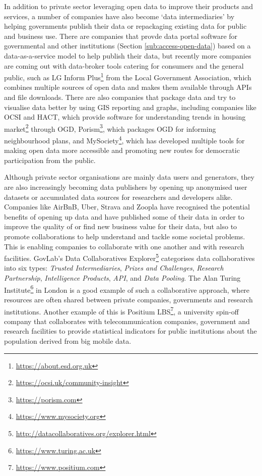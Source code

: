 In addition to private sector leveraging open data to improve their products and services, a number of companies have also become `data intermediaries' \citep{gurin_open_2019} by helping governments publish their data or repackaging existing data for public and business use. There are companies that provde data portal software for governmental and other institutions (Section \ref{sub:access-open-data}) based on a data-as-a-service model to help publish their data, but recently more companies are coming out with data-broker tools catering for consumers and the general public, such as LG Inform Plus\footnote{\url{https://about.esd.org.uk}} from the Local Government Association, which combines multiple sources of open data and makes them available through APIs and file downloads. There are also companies that package data and try to visualise data better by using GIS reporting and graphs, including companies like OCSI and HACT, which provide software for understanding trends in housing market\footnote{\url{https://ocsi.uk/community-insight}} through OGD, Porism\footnote{\url{https://porism.com}}, which packages OGD for informing neighbourhood plans, and MySociety\footnote{\url{https://www.mysociety.org}}, which has developed multiple tools for making open data more accessible and promoting new routes for democratic participation from the public.

Although private sector organisations are mainly data users and generators, they are also increasingly becoming data publishers by opening up anonymised user datasets or accumulated data sources for researchers and developers alike. Companies like AirBnB, Uber, Strava and Zoopla have recognised the potential benefits of opening up data and have published some of their data in order to improve the quality of or find new business value for their data, but also to promote collaborations to help understand and tackle some societal problems. This is enabling companies to collaborate with one another and with research facilities. GovLab's Data Collaboratives Explorer\footnote{\url{http://datacollaboratives.org/explorer.html}} categorises data collaboratives into six types: \textit{Trusted Intermediaries}, \textit{Prizes and Challenges}, \textit{Research Partnership}, \textit{Intelligence Products}, \textit{API}, and \textit{Data Pooling}. The Alan Turing Institute\footnote{\url{https://www.turing.ac.uk}} in London is a good example of such a collaborative approach, where resources are often shared between private companies, governments and research institutions. Another example of this is Positium LBS\footnote{\url{https://www.positium.com}}, a university spin-off company that collaborates with telecommunication companies, government and research facilities to provide statistical indicators for public institutions about the population derived from big mobile data.


